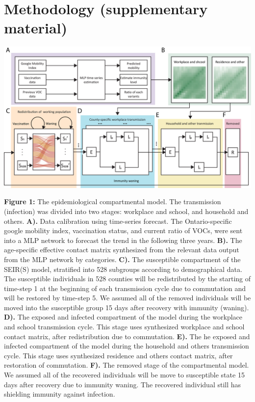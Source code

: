 \documentclass[12pt]{article}
\begin{document}
\section{Methodology (supplementary material)}
\begin{center}
    \includegraphics[width = 480pt]{Figure 1.jpg}
\end{center}
\textbf{Figure 1:} The epidemiological compartmental model. The transmission (infection) was divided into two stages: workplace and school, and household and others. \textbf{A).} Data calibration using time-series forecast. The Ontario-specific google mobility index, vaccination status, and current ratio of VOCs, were sent into a MLP network to forecast the trend in the following three years. \textbf{B).} The age-specific effective contact matrix synthesized from the relevant data output from the MLP network by categories. \textbf{C).} The susceptible compartment of the SEIR(S) model, stratified into 528 subgroups according to demographical data. The susceptible individuals in 528 counties will be redistributed by the starting of time-step 1 at the beginning of each transmission cycle due to commutation and will be restored by time-step 5. We assumed all of the removed individuals will be moved into the susceptible group 15 days after recovery with immunity (waning). \textbf{D).} The exposed and infected compartment of the model during the workplace and school transmission cycle. This stage uses synthesized workplace and school contact matrix, after redistribution due to commutation. \textbf{E).} The he exposed and infected compartment of the model during the household and others transmission cycle. This stage uses synthesized residence and others contact matrix, after restoration of commutation. \textbf{F).} The removed stage of the compartmental model. We assumed all of the recovered individuals will be move to susceptible state 15 days after recovery due to immunity waning. The recovered individual still has shielding immunity against infection.
\end{document}
